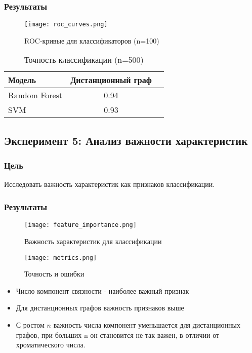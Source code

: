 \documentclass[a4paper, 12pt]{article}
\begin{document}
\subsubsection{Результаты}
\begin{figure}[H]
    \centering
    \texttt{[image: roc\_curves.png]}
    \caption{ROC-кривые для классификаторов (n=100)}
\end{figure}

\begin{table}[H]
\centering
\caption{Точность классификации (n=500)}
\begin{tabular}{lcc}
\toprule
Модель & Дистанционный граф \\
\midrule
Random Forest &  0.94 \\
SVM & 0.93 \\
\bottomrule
\end{tabular}
\end{table}

\subsection{Эксперимент 5: Анализ важности характеристик}
\subsubsection{Цель}
Исследовать важность характеристик как признаков классификации.

\subsubsection{Результаты}
\begin{figure}[H]
    \centering
    \texttt{[image: feature\_importance.png]}
    \caption{Важность характеристик для классификации}
\end{figure}
\begin{figure}[H]
    \centering
    \texttt{[image: metrics.png]}
    \caption{Точность и ошибки}
\end{figure}

\begin{itemize}
    \item Число компонент связности - наиболее важный признак
    \item Для дистанционных графов важность признаков выше
    \item С ростом $n$ важность числа компонент уменьшается для дистанционных графов, при больших n он становится не так важен, в отличии от хроматического числа.
\end{itemize}
\end{document}
